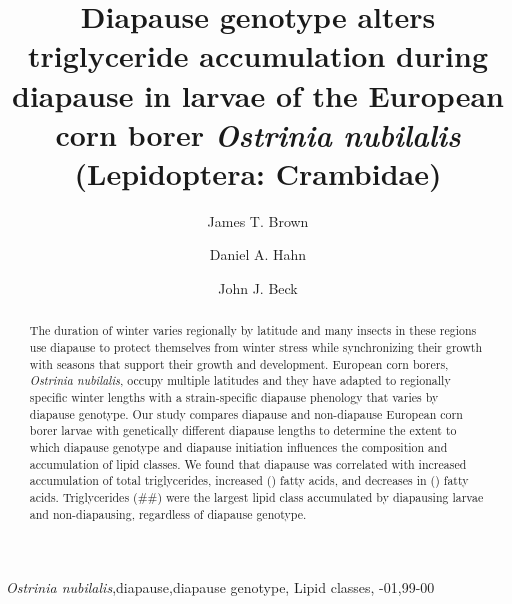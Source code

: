 \documentclass[review]{elsarticle}
\begin{document}
\begin{frontmatter}

\title{Diapause genotype alters triglyceride accumulation during diapause in larvae of the European corn borer \textit{Ostrinia nubilalis} (Lepidoptera: Crambidae)}


\author[usda,uf]{James T. Brown}

\author[uf]{Daniel A. Hahn}
\author[usda]{John J. Beck}

\address[usda]{USDA‐ARS Center for Medical, Agricultural and Veterinary Entomology, 1700 SW 23rd Drive, Gainesville, FL 32608, USA}

\address[uf]{Department of Entomology and Nematology, University of Florida, Gainesville, FL 32611}

\begin{abstract}
The duration of winter varies regionally by latitude and many insects in these regions use diapause to protect themselves from winter stress while synchronizing their growth with seasons that support their growth and development. European corn borers, \textit{Ostrinia nubilalis}, occupy multiple latitudes and they have adapted to regionally specific winter lengths with a strain-specific diapause phenology that varies by diapause genotype. Our study compares diapause and non-diapause European corn borer larvae with genetically different diapause lengths to determine the extent to which diapause genotype and diapause initiation influences the composition and accumulation of lipid classes. We found that diapause was correlated with increased accumulation of total triglycerides, increased () fatty acids, and decreases in () fatty acids. Triglycerides (##) were the largest lipid class accumulated by diapausing larvae and non-diapausing, regardless  of diapause genotype. 
\end{abstract}

\begin{keyword}
\textttInsect \textit{Ostrinia nubilalis}\sep diapause\sep diapause genotype\sep 
Lipid classes\sep
{}-01\sep  99-00
\end{keyword}

\end{frontmatter}
\end{document}
